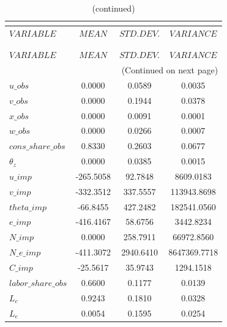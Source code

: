 
\begin{center}
\begin{longtable}{lccc} 
\caption{THEORETICAL MOMENTS}\\
 \label{Table:th_moments}\\
\toprule 
$VARIABLE           $	 & 	 $            MEAN$	 & 	 $       STD. DEV.$	 & 	 $        VARIANCE$\\
\midrule \endfirsthead 
\caption{(continued)}\\
 \toprule \\ 
$VARIABLE           $	 & 	 $            MEAN$	 & 	 $       STD. DEV.$	 & 	 $        VARIANCE$\\
\midrule \endhead 
\midrule \multicolumn{4}{r}{(Continued on next page)} \\ \bottomrule \endfoot 
\bottomrule \endlastfoot 
$u\_obs             $	 & 	          0.0000	 & 	          0.0589	 & 	          0.0035 \\ 
$v\_obs             $	 & 	          0.0000	 & 	          0.1944	 & 	          0.0378 \\ 
$x\_obs             $	 & 	          0.0000	 & 	          0.0091	 & 	          0.0001 \\ 
$w\_obs             $	 & 	          0.0000	 & 	          0.0266	 & 	          0.0007 \\ 
$cons\_share\_obs   $	 & 	          0.8330	 & 	          0.2603	 & 	          0.0677 \\ 
${\theta_z}         $	 & 	          0.0000	 & 	          0.0385	 & 	          0.0015 \\ 
$u\_imp             $	 & 	       -265.5058	 & 	         92.7848	 & 	       8609.0183 \\ 
$v\_imp             $	 & 	       -332.3512	 & 	        337.5557	 & 	     113943.8698 \\ 
$theta\_imp         $	 & 	        -66.8455	 & 	        427.2482	 & 	     182541.0560 \\ 
$e\_imp             $	 & 	       -416.4167	 & 	         58.6756	 & 	       3442.8234 \\ 
$N\_imp             $	 & 	          0.0000	 & 	        258.7911	 & 	      66972.8560 \\ 
$N\_e\_imp          $	 & 	       -411.3072	 & 	       2940.6410	 & 	    8647369.7718 \\ 
$C\_imp             $	 & 	        -25.5617	 & 	         35.9743	 & 	       1294.1518 \\ 
$labor\_share\_obs  $	 & 	          0.6600	 & 	          0.1177	 & 	          0.0139 \\ 
${L_c}              $	 & 	          0.9243	 & 	          0.1810	 & 	          0.0328 \\ 
${L_e}              $	 & 	          0.0054	 & 	          0.1595	 & 	          0.0254 \\ 
\end{longtable}
 \end{center}
